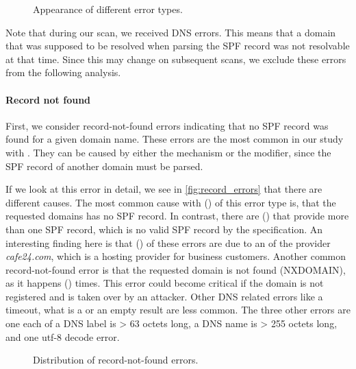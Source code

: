 \begin{figure}[htbp]
	\centerline{}
	\vspace{-6pt}
	\caption{Appearance of different error types.}
	\label{fig:spf_errors}
\end{figure}

Note that during our scan, we received \numprint{\DNSRecordNotFound} DNS errors.
This means that a domain that was supposed to be resolved when parsing the SPF record was not resolvable at that time. Since this may change on subsequent scans, we exclude these errors from the following analysis.




\paragraph{Record not found}
First, we consider record-not-found errors indicating that no SPF record was found for a given domain name. These errors are the most common in our study with \SPFRecordNotFoundPerc.
They can be caused by either the  mechanism or the  modifier, since the SPF record of another domain must be parsed.

If we look at this error in detail, we see in \autoref{fig:record_errors} that there are different causes.
The most common cause with \RecordNotFoundSpfMissingPerc (\numprint{\RecordNotFoundSpfMissing}) of this error type is, that the requested domains has no SPF record. 
In contrast, there are \RecordNotFoundSpfMultiplePerc (\numprint{\RecordNotFoundSpfMultiple}) that provide more than one SPF record, which is no valid SPF record by the specification.
An interesting finding here is that \RecordNotFoundSpfMultipleCafeComPerc (\numprint{\RecordNotFoundSpfMultipleCafeCom}) of these errors are due to an  of the provider \textit{cafe24.com}, which is a hosting provider for business customers.
Another common record-not-found error is that the requested domain is not found (NXDOMAIN), as it happens \numprint{\RecordNotFoundNotExisting} (\RecordNotFoundNotExistingPerc) times.
This error could become critical if the domain is not registered and is taken over by an attacker.
Other DNS related errors like a timeout, what is a  or an empty result are less common.
The three other errors are one each of a DNS label is > 63 octets long, a DNS name is > 255 octets long, and one utf-8 decode error. 

\begin{figure}[htbp]
	\centerline{}
	\vspace{-6pt}
	\caption{Distribution of record-not-found errors.}
	\label{fig:record_errors}
\end{figure}


